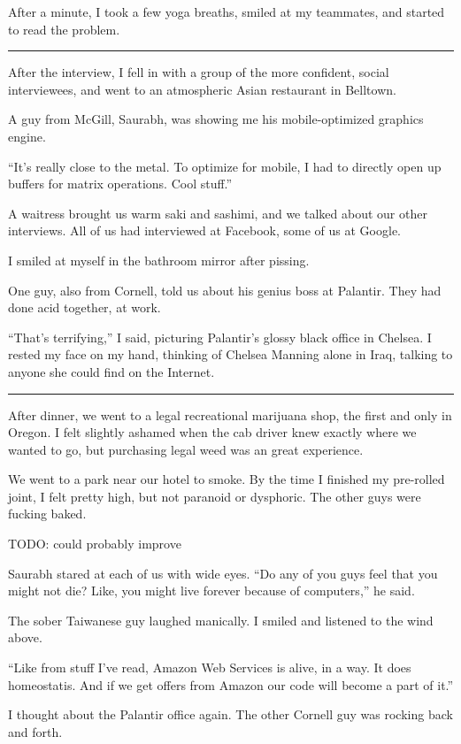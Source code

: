 After a minute, I took a few yoga breaths, smiled at my teammates, and started
to read the problem.

\plainfancybreak{12pt}{2}{* * *}

After the interview, I fell in with a group of the more confident, social
interviewees, and went to an atmospheric Asian restaurant in Belltown.

A guy from McGill, Saurabh, was showing me his mobile-optimized graphics engine.

``It's really close to the metal.  To optimize for mobile, I had to directly
open up buffers for matrix operations.  Cool stuff.''

A waitress brought us warm saki and sashimi, and we talked about our other
interviews.  All of us had interviewed at Facebook, some of us at Google.  

I smiled at myself in the bathroom mirror after pissing.

One guy, also from Cornell, told us about his genius boss at Palantir.  They had
done acid together, at work.

``That's terrifying,'' I said, picturing Palantir's glossy black office in
Chelsea.  I rested my face on my hand, thinking of Chelsea Manning alone in
Iraq, talking to anyone she could find on the Internet.

\plainfancybreak{12pt}{2}{* * *}

After dinner, we went to a legal recreational marijuana shop, the first and only
in Oregon.  I felt slightly ashamed when the cab driver knew exactly where we
wanted to go, but purchasing legal weed was an great experience.

We went to a park near our hotel to smoke.  By the time I finished my pre-rolled
joint, I felt pretty high, but not paranoid or dysphoric.  The other guys were
fucking baked. 

TODO: could probably improve

Saurabh stared at each of us with wide eyes.  ``Do any of you guys feel that you
might not die?  Like, you might live forever because of computers,'' he said.

The sober Taiwanese guy laughed manically.  I smiled and listened to the wind
above.

``Like from stuff I've read, Amazon Web Services is alive, in a way.  It does
homeostatis.  And if we get offers from Amazon our code will become a part of
it.''

I thought about the Palantir office again.  The other Cornell guy was rocking
back and forth.

